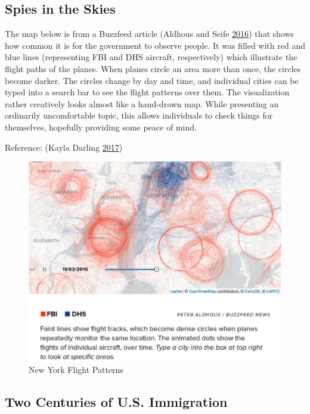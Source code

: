 \documentclass[]{book}
\begin{document}
\hypertarget{spies-in-the-skies}{%
\subsection{Spies in the Skies}\label{spies-in-the-skies}}

The map below is from a Buzzfeed article (Aldhous and Seife \protect\hyperlink{ref-spies_sky}{2016}) that shows how common it is for the government to observe people. It was filled with red and blue lines (representing FBI and DHS aircraft, respectively) which illustrate the flight paths of the planes. When planes circle an area more than once, the circles become darker. The circles change by day and time, and individual cities can be typed into a search bar to see the flight patterns over them. The visualization rather creatively looks almost like a hand-drawn map. While presenting an ordinarily uncomfortable topic, this allows individuals to check things for themselves, hopefully providing some peace of mind.

Reference: (Kayla Darling \protect\hyperlink{ref-cool_data}{2017})

\begin{figure}
\centering
\includegraphics{images/NYCflights.png}
\caption{New York Flight Patterns}
\end{figure}

\hypertarget{two-centuries-of-u.s.-immigration}{%
\subsection{Two Centuries of U.S. Immigration}\label{two-centuries-of-u.s.-immigration}}
\end{document}
